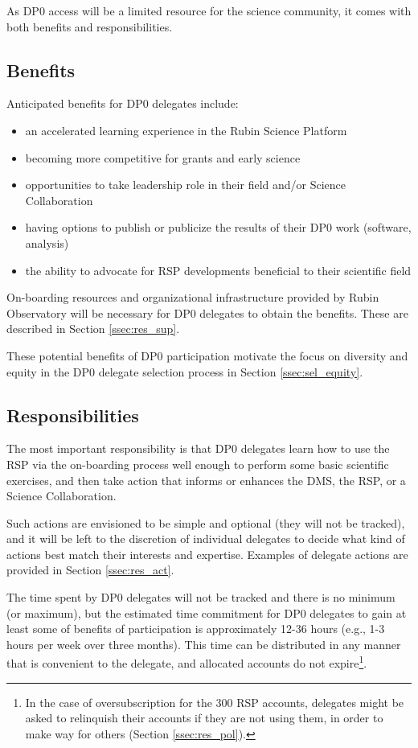 \documentclass[DM,lsstdraft,authoryear,toc]{lsstdoc}
\begin{document}
As DP0 access will be a limited resource for the science community, it comes with both benefits and responsibilities.

\subsection{Benefits}\label{ssec:del_bene}

Anticipated benefits for DP0 delegates include:
\begin{itemize}
\item an accelerated learning experience in the Rubin Science Platform
\item becoming more competitive for grants and early science
\item opportunities to take leadership role in their field and/or Science Collaboration
\item having options to publish or publicize the results of their DP0 work (software, analysis)
\item the ability to advocate for RSP developments beneficial to their scientific field
\end{itemize}

On-boarding resources and organizational infrastructure provided by Rubin Observatory will be necessary for DP0 delegates to obtain the benefits. These are described in Section \ref{ssec:res_sup}.

These potential benefits of DP0 participation motivate the focus on diversity and equity in the DP0 delegate selection process in Section \ref{ssec:sel_equity}.

\subsection{Responsibilities}\label{ssec:del_resp}

The most important responsibility is that DP0 delegates learn how to use the RSP via the on-boarding process well enough to perform some basic scientific exercises, and then take action that informs or enhances the DMS, the RSP, or a Science Collaboration. 

Such actions are envisioned to be simple and optional (they will not be tracked), and it will be left to the discretion of individual delegates to decide what kind of actions best match their interests and expertise.
Examples of delegate actions are provided in Section \ref{ssec:res_act}.

The time spent by DP0 delegates will not be tracked and there is no minimum (or maximum), but the estimated time commitment for DP0 delegates to gain at least some of benefits of participation is approximately 12-36 hours (e.g., 1-3 hours per week over three months).
This time can be distributed in any manner that is convenient to the delegate, and allocated accounts do not expire\footnote{In the case of oversubscription for the 300 RSP accounts, delegates might be asked to relinquish their accounts if they are not using them, in order to make way for others (Section \ref{ssec:res_pol}).}.
\end{document}
